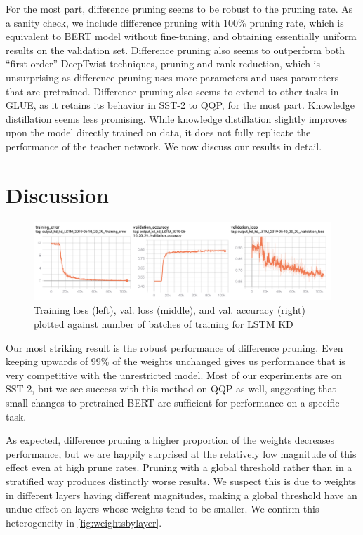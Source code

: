 \documentclass[10pt]{article}
\begin{document}
For the most part, difference pruning seems to be robust to the pruning
rate. As a sanity check, we include difference pruning with 100\% pruning
rate, which is equivalent to BERT model without fine-tuning, and obtaining
essentially uniform results on the validation set. Difference pruning also
seems to outperform both ``first-order'' DeepTwist techniques, pruning and
rank reduction, which is unsurprising as difference pruning uses more
parameters and uses parameters that are pretrained. Difference pruning also
seems to extend to other tasks in GLUE, as it retains its behavior in
SST-2 to QQP, for the most part. Knowledge distillation seems less
promising. While knowledge distillation
slightly improves upon the model directly trained on data, it does not
fully replicate the performance of the teacher network. We now discuss our
results in detail.





\section{Discussion}


\begin{figure}[htb]
\centering
\includegraphics[width=\textwidth]{../figs/kd_lstm_training.png}
\caption{Training loss (left), val. loss (middle), and val. accuracy
(right) plotted against number of batches of training for LSTM KD}
\label{fig:kdlstmloss}
\end{figure}

Our most striking result is the robust performance of difference pruning. Even
keeping upwards of 99\% of the weights unchanged gives us performance that is
very competitive with the unrestricted model. Most of our experiments are on
SST-2, but we see success with this method on QQP as well, suggesting that
small changes to pretrained BERT are sufficient for performance on a specific
task. 

As expected, difference pruning a higher proportion of the weights decreases
performance, but we are happily surprised at the relatively low magnitude of
this effect even at high prune rates. Pruning with a global threshold rather
than in a stratified way produces distinctly worse results. We suspect this is
due to weights in different layers having different magnitudes, making a global
threshold have an undue effect on layers whose weights tend to be smaller. We
confirm this heterogeneity in \cref{fig:weightsbylayer}.
\end{document}
